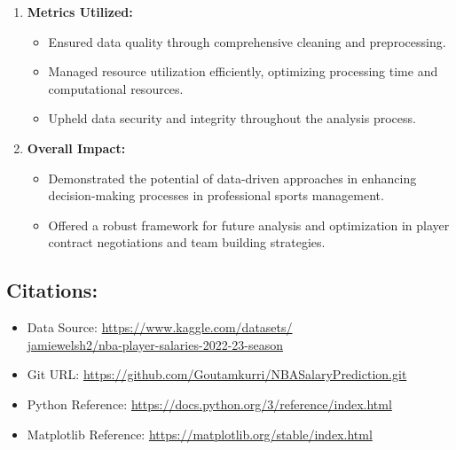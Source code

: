 \documentclass{article}
\begin{document}
\begin{enumerate}
\item \textbf{Metrics Utilized:} \begin{itemize}
    \item Ensured data quality through comprehensive cleaning and preprocessing.
    \item Managed resource utilization efficiently, optimizing processing time and computational resources.
    \item Upheld data security and integrity throughout the analysis process.
\end{itemize}
\item \textbf{Overall Impact:} \begin{itemize}
    \item Demonstrated the potential of data-driven approaches in enhancing decision-making processes in professional sports management.
    \item Offered a robust framework for future analysis and optimization in player contract negotiations and team building strategies.
\end{itemize}
\end{enumerate}

\subsection*{Citations:}
\begin{itemize}
    \item Data Source: \textcolor{blue}{\url{https://www.kaggle.com/datasets/}}\\
\textcolor{blue}{\url{jamiewelsh2/nba-player-salaries-2022-23-season}}
    \item Git URL: \textcolor{blue}{\url{https://github.com/Goutamkurri/NBASalaryPrediction.git}}
    \item Python Reference: \textcolor{blue}{\url{https://docs.python.org/3/reference/index.html}}
    \item Matplotlib Reference: \textcolor{blue}{\url{https://matplotlib.org/stable/index.html}}
\end{itemize}
\end{document}
